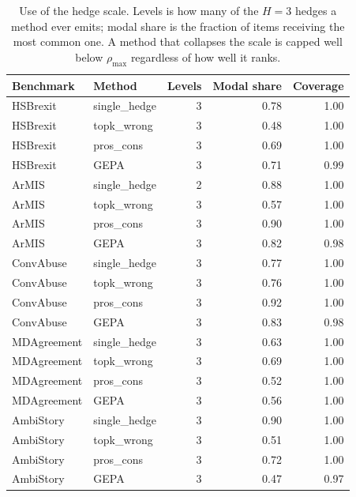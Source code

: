 \begin{table}[t]
\centering
\small
\begin{tabular}{llrrr}
\hline
Benchmark & Method & Levels & Modal share & Coverage \\
\hline
HSBrexit & single\_hedge & 3 & 0.78 & 1.00 \\
HSBrexit & topk\_wrong & 3 & 0.48 & 1.00 \\
HSBrexit & pros\_cons & 3 & 0.69 & 1.00 \\
HSBrexit & GEPA & 3 & 0.71 & 0.99 \\
ArMIS & single\_hedge & 2 & 0.88 & 1.00 \\
ArMIS & topk\_wrong & 3 & 0.57 & 1.00 \\
ArMIS & pros\_cons & 3 & 0.90 & 1.00 \\
ArMIS & GEPA & 3 & 0.82 & 0.98 \\
ConvAbuse & single\_hedge & 3 & 0.77 & 1.00 \\
ConvAbuse & topk\_wrong & 3 & 0.76 & 1.00 \\
ConvAbuse & pros\_cons & 3 & 0.92 & 1.00 \\
ConvAbuse & GEPA & 3 & 0.83 & 0.98 \\
MDAgreement & single\_hedge & 3 & 0.63 & 1.00 \\
MDAgreement & topk\_wrong & 3 & 0.69 & 1.00 \\
MDAgreement & pros\_cons & 3 & 0.52 & 1.00 \\
MDAgreement & GEPA & 3 & 0.56 & 1.00 \\
AmbiStory & single\_hedge & 3 & 0.90 & 1.00 \\
AmbiStory & topk\_wrong & 3 & 0.51 & 1.00 \\
AmbiStory & pros\_cons & 3 & 0.72 & 1.00 \\
AmbiStory & GEPA & 3 & 0.47 & 0.97 \\
\hline
\end{tabular}
\caption{Use of the hedge scale. Levels is how many of the $H=3$ hedges a method ever emits; modal share is the fraction of items receiving the most common one. A method that collapses the scale is capped well below $\rho_{\max}$ regardless of how well it ranks.}
\label{tab:stability}
\end{table}